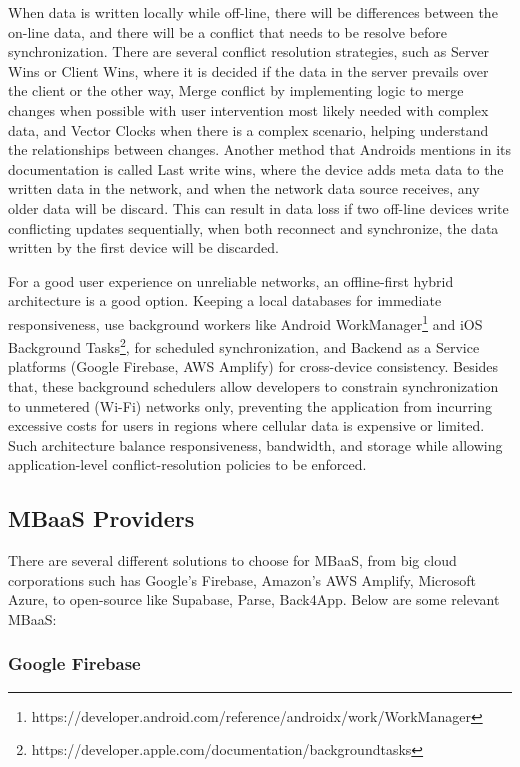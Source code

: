 When data is written locally while off-line, there will be differences between the on-line data, and there will be a conflict that needs to be resolve before synchronization. There are several conflict resolution strategies, such as Server Wins or Client Wins, where it is decided if the data in the server prevails over the client or the other way, Merge conflict by implementing logic to merge changes when possible with user intervention most likely needed with complex data, and Vector Clocks when there is a complex scenario, helping understand the relationships between changes\cite{mediuDataSync}. Another method that Androids mentions in its documentation is called Last write wins, where the device adds meta data to the written data in the network, and when the network data source receives, any older data will be discard\cite{dataLayer}. This can result in data loss if two off-line devices write conflicting updates sequentially, when both reconnect and synchronize, the data written by the first device will be discarded.

For a good user experience on unreliable networks, an offline-first hybrid architecture is a good option. Keeping a local databases for immediate responsiveness, use background workers like Android WorkManager\footnote{https://developer.android.com/reference/androidx/work/WorkManager} and iOS Background Tasks\footnote{https://developer.apple.com/documentation/backgroundtasks}, for scheduled synchronization, and Backend as a Service platforms (Google Firebase, AWS Amplify) for cross-device consistency. Besides that, these background schedulers allow developers to constrain synchronization to unmetered (Wi-Fi) networks only, preventing the application from incurring excessive costs for users in regions where cellular data is expensive or limited\cite{workmanager}. Such architecture balance responsiveness, bandwidth, and storage while allowing application-level conflict-resolution policies to be enforced.



\subsection{MBaaS Providers}\label{subsec:mbaas}

There are several different solutions to choose for MBaaS, from big cloud corporations such has Google's Firebase, Amazon's AWS Amplify, Microsoft Azure, to open-source like Supabase, Parse, Back4App. Below are some relevant MBaaS:

\subsubsection{\textbf{Google Firebase}}

